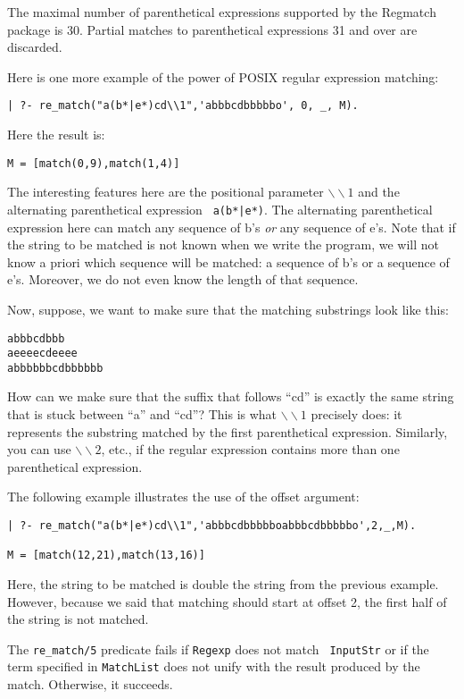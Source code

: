 The maximal number of parenthetical expressions supported by the Regmatch
package is 30. Partial matches to parenthetical expressions 31 and over are
discarded.

Here is one more example of the power of POSIX regular expression matching:
\begin{verbatim}
| ?- re_match("a(b*|e*)cd\\1",'abbbcdbbbbbo', 0, _, M).  
\end{verbatim}
Here the result is:
\begin{verbatim}
M = [match(0,9),match(1,4)]
\end{verbatim}
The interesting features here are the positional parameter
$\backslash\backslash 1$ and the alternating parenthetical expression {\tt
a(b*|e*)}. The alternating parenthetical expression here can match any
sequence of b's \emph{or} any sequence of e's. Note that if the string to
be matched is not known when we write the program, we will not know a
priori which sequence will be matched: a sequence of b's or a sequence of e's.
Moreover, we do not even know the length of that sequence.

Now, suppose, we want to make sure that the matching substrings look like this:
\begin{verbatim}
abbbcdbbb
aeeeecdeeee
abbbbbbcdbbbbbb
\end{verbatim}
How can we make sure that the suffix that follows ``cd'' is exactly the same
string that is stuck between ``a'' and ``cd''? This is what
$\backslash\backslash 1$ precisely does: it represents the substring
matched by the first parenthetical expression. Similarly, you can use
$\backslash\backslash 2$, etc., if the regular expression contains more
than one parenthetical expression.

The following example illustrates the use of the offset argument:
\begin{verbatim}
| ?- re_match("a(b*|e*)cd\\1",'abbbcdbbbbboabbbcdbbbbbo',2,_,M).  

M = [match(12,21),match(13,16)]  
\end{verbatim}
Here, the string to be matched is double the string from the previous
example. However, because we said that matching should start at offset 2,
the first half of the string is not matched.

The \verb|re_match/5| predicate fails if {\tt Regexp} does not match {\tt
  InputStr} or if the term specified in {\tt MatchList} does not unify with
the result produced by the match.  Otherwise, it succeeds.


